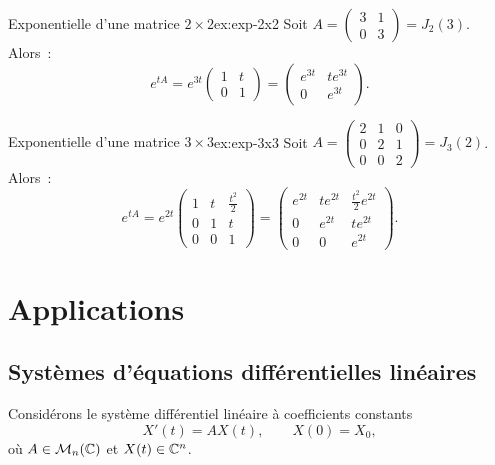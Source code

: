 \begin{example}{Exponentielle d'une matrice $2\times 2$}{ex:exp-2x2}
  Soit $A=\begin{pmatrix}3&1\\0&3\end{pmatrix}=J_2(3)$. Alors~:
  \[
    e^{tA}=e^{3t}\begin{pmatrix}1&t\\0&1\end{pmatrix}
    =\begin{pmatrix}e^{3t}&te^{3t}\\0&e^{3t}\end{pmatrix}.
  \]
\end{example}

\begin{example}{Exponentielle d'une matrice $3\times 3$}{ex:exp-3x3}
  Soit $A=\begin{pmatrix}2&1&0\\0&2&1\\0&0&2\end{pmatrix}=J_3(2)$. Alors~:
  \[
    e^{tA}=e^{2t}\begin{pmatrix}1&t&\frac{t^2}{2}\\0&1&t\\0&0&1\end{pmatrix}
    =\begin{pmatrix}e^{2t}&te^{2t}&\frac{t^2}{2}e^{2t}\\
    0&e^{2t}&te^{2t}\\0&0&e^{2t}\end{pmatrix}.
  \]
\end{example}


\section{Applications}\label{sec:applications-jordan}

\subsection{Systèmes d'équations différentielles linéaires}%
\label{subsec:edo-jordan}

Considérons le système différentiel linéaire à coefficients constants
\begin{equation}\label{eq:systeme-diff}
  X'(t)=AX(t),\qquad X(0)=X_0,
\end{equation}
où $A\in\mathcal{M}_n({\mathbb{C}})$ et $X(t)\in{\mathbb{C}}^n$.

